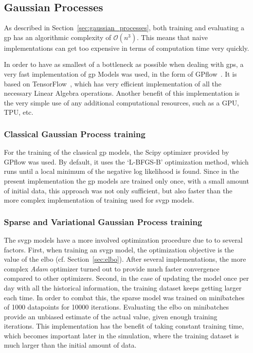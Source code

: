 \subsection{Gaussian Processes}

As described in Section~\ref{sec:gaussian_processes}, both training and
evaluating a \acrshort{gp} has an algorithmic complexity of $\mathcal{O}(n^3)$.
This means that naive implementations can get too expensive in terms of
computation time very quickly.

In order to have as smallest of a bottleneck as possible when dealing with
\acrshort{gp}s, a very fast implementation of \acrlong{gp} Models was used, in
the form of GPflow~\cite{matthewsGPflowGaussianProcess2017}. It is based on
TensorFlow~\cite{tensorflow2015-whitepaper}, which has very efficient
implementation of all the necessary Linear Algebra operations. Another benefit
of this implementation is the very simple use of any additional computational
resources, such as a GPU, TPU, etc.

\subsubsection{Classical Gaussian Process training}

For the training of the classical \acrshort{gp} models, the Scipy optimizer
provided by GPflow was used. By default, it uses the `L-BFGS-B' optimization
method, which runs until a local minimum of the negative log likelihood is
found. Since in the present implementation the \acrshort{gp} models are trained
only once, with a small amount of initial data, this approach was not only
sufficient, but also faster than the more complex implementation of training
used for \acrshort{svgp} models.

\subsubsection{Sparse and Variational Gaussian Process training}

The \acrshort{svgp} models have a more involved optimization procedure due to to
several factors. First, when training an \acrshort{svgp} model, the optimization
objective is the value of the \acrshort{elbo} (cf. Section~\ref{sec:elbo}).
After several implementations, the more complex \textit{Adam} optimizer turned
out to provide much faster convergence compared to other optimizers. Second, in
the case of updating the model once per day with all the historical information,
the training dataset keeps getting larger each time. In order to combat this,
the sparse model was trained on minibatches of 1000 datapoints for 10000
iterations. Evaluating the \acrshort{elbo} on minibatches provide an unbiased
estimate of the actual value, given enough training iterations. This
implementation has the benefit of taking constant training time, which becomes
important later in the simulation, where the training dataset is much larger
than the initial amount of data.  

